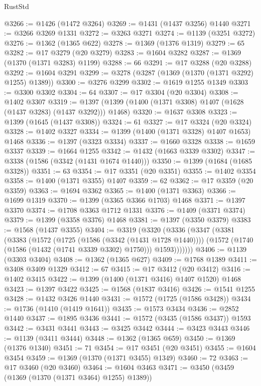 \begin{lexlean}{RustStd}
\begin{coremodule}
@3266 := @1426 (@1472 @3264)
@3269 := @1431 (@1437 @3256) @1440
@3271 := @3266 @3269 @1331
@3272 := @3263 @3271
@3274 := @1139 (@3251 @3272)
@3276 := @1362 (@1365 @622)
@3278 := @1369 (@1376 @1319)
@3279 := 65
@3282 := @17 @3279 (@20 @3279)
@3283 := @1604 @3282
@3287 := @1369 (@1370 (@1371 @3283) @1199)
@3288 := 66
@3291 := @17 @3288 (@20 @3288)
@3292 := @1604 @3291
@3299 := @3278 (@3287 (@1369 (@1370 (@1371 @3292) @1255) @1389))
@3300 := @3276 @3299
@3302 := @1619 @1255 @1349
@3303 := @3300 @3302
@3304 := 64
@3307 := @17 @3304 (@20 @3304)
@3308 := @1402 @3307
@3319 := @1397 (@1399 (@1400 (@1371 @3308) @1407 (@1628 (@1437 @3283) (@1437 @3292))) @1468)
@3320 := @1637 @3308
@3323 := @1399 (@1645 (@1437 @3308))
@3324 := 61
@3327 := @17 @3324 (@20 @3324)
@3328 := @1402 @3327
@3334 := @1399 (@1400 (@1371 @3328) @1407 @1653) @1468
@3336 := @1397 (@3323 @3334)
@3337 := @1660 @3328
@3338 := @1659 @3337
@3339 := @1664 @1255
@3342 := @1432 (@1663 @3339 @3302)
@3347 := @3338 (@1586 (@3342 (@1431 @1674 @1440)))
@3350 := @1399 (@1684 (@1685 @3328))
@3351 := 63
@3354 := @17 @3351 (@20 @3351)
@3355 := @1402 @3354
@3358 := @1400 (@1371 @3355) @1407
@3359 := 62
@3362 := @17 @3359 (@20 @3359)
@3363 := @1694 @3362
@3365 := @1400 (@1371 @3363)
@3366 := @1699 @1319
@3370 := @1399 (@3365 @3366 @1703) @1468
@3371 := @1397 @3370
@3374 := @1708 @3363 @1712 @1331
@3376 := @1409 (@3371 @3374)
@3379 := @1399 (@3358 @3376) @1468
@3381 := @1397 (@3350 @3379)
@3383 := @1568 (@1437 @3355)
@3404 := @3319
    (@3320
      (@3336
        (@3347
          (@3381
            (@3383
              (@1572
                (@1725 (@1586 (@3342 (@1431 @1728 @1440))))
                (@1572 (@1740 (@1586 (@1432 (@1741 @3339 @3302) @1750))) @1593)))))))
@3406 := @1139 (@3303 @3404)
@3408 := @1362 (@1365 @627)
@3409 := @1768 @1389
@3411 := @3408 @3409 @1329
@3412 := 67
@3415 := @17 @3412 (@20 @3412)
@3416 := @1402 @3415
@3422 := @1399 (@1400 (@1371 @3416) @1407 @1520) @1468
@3423 := @1397 @3422
@3425 := @1568 (@1837 @3416)
@3426 := @1541 @1255
@3428 := @1432 @3426 @1440
@3431 := @1572 (@1725 (@1586 @3428))
@3434 := @1736 (@1410 (@1419 @1641))
@3435 := @1573 @3434
@3436 := @2852 @1440
@3437 := @1895 @3436
@3441 := @1572 (@3435 (@1586 @3437)) @1593
@3442 := @3431 @3441
@3443 := @3425 @3442
@3444 := @3423 @3443
@3446 := @1139 (@3411 @3444)
@3448 := @1362 (@1365 @659)
@3450 := @1369 (@1376 @1340)
@3451 := 71
@3454 := @17 @3451 (@20 @3451)
@3455 := @1604 @3454
@3459 := @1369 (@1370 (@1371 @3455) @1349)
@3460 := 72
@3463 := @17 @3460 (@20 @3460)
@3464 := @1604 @3463
@3471 := @3450 (@3459 (@1369 (@1370 (@1371 @3464) @1255) @1389))

\end{coremodule}
\end{lexlean}
